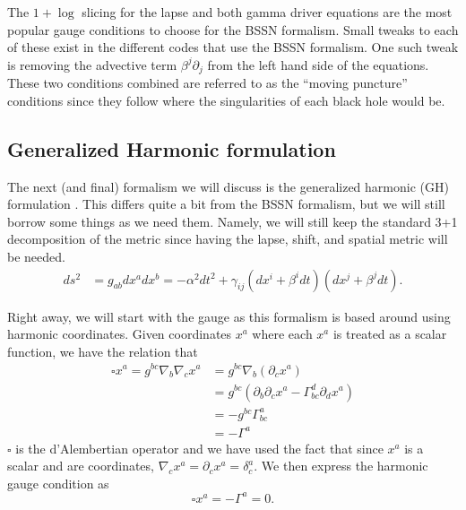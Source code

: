 \begin{bibunit}[unsrtnat]
The $1+\log$ slicing for the lapse and both gamma driver equations are the
most popular gauge conditions to choose for the BSSN formalism. Small tweaks to
each of these exist in the different codes that use the BSSN formalism. One such
tweak is removing the advective term $\beta^j\partial_j$ from the left hand side
of the equations. These two conditions combined are referred to as the ``moving
puncture'' conditions since they follow where the singularities of each black
hole would be.

\subsection{Generalized Harmonic formulation\label{sec:gh}}
The next (and final) formalism we will discuss is the generalized harmonic (GH)
formulation \cite{Lindblom:2005qh}. This differs quite a bit from the BSSN formalism, but we
will still borrow some things as we need them. Namely, we will still keep the
standard 3+1 decomposition of the metric since having the lapse, shift, and
spatial metric will be needed.
\begin{eqnarray}
  ds^2 &= g_{ab}dx^a dx^b =-\alpha^2 dt^2 + \gamma_{ij}
         \left(dx^i+\beta^i dt\right) \left(dx^j +\beta^j dt\right) .
\end{eqnarray}

Right away, we will start with the gauge as this formalism is based around using
harmonic coordinates. Given coordinates $x^a$ where each $x^a$ is treated as a
scalar function, we have the relation that
\begin{align}
   \square x^a = g^{bc}\nabla_b\nabla_c x^a &= g^{bc}\nabla_b(\partial_c x^a) \nonumber\\
   &= g^{bc}(\partial_b\partial_cx^a - \Gamma^d_{bc}\partial_dx^a) \nonumber\\
   &= -g^{bc}\Gamma^a_{bc} \nonumber\\
   &= -\Gamma^a
\end{align}
$\square$ is the d'Alembertian operator and we have used the fact that since
$x^a$ is a scalar and are coordinates, $\nabla_cx^a=\partial_cx^a=\delta^a_c$.
We then express the harmonic gauge condition as
\begin{equation}
   \square x^a = -\Gamma^a = 0 .
\end{equation}


\end{bibunit}
